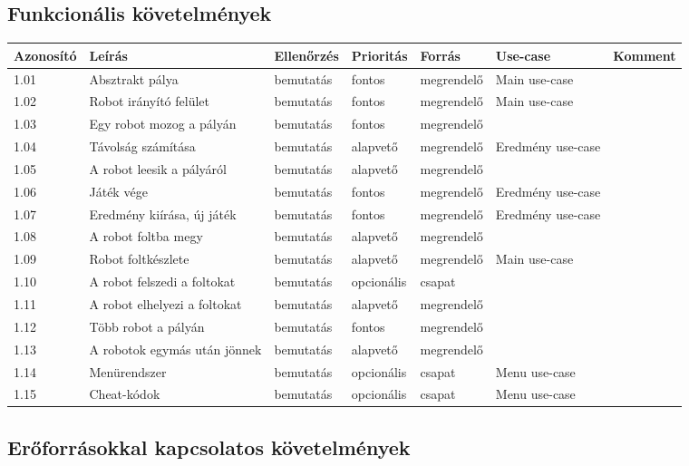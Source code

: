 \subsection{Funkcionális követelmények}


\begin{longtable}{| l | l | l | l | l | l | l |}
\hline
\textbf{Azonosító}   & \textbf{Leírás} & \textbf{Ellenőrzés} & \textbf{Prioritás} & \textbf{Forrás} & \textbf{Use-case} & \textbf{Komment} \tabularnewline
\hline\hline
1.01 & Absztrakt pálya & bemutatás & fontos & megrendelő & Main use-case & \tabularnewline
\hline
1.02 & Robot irányító felület & bemutatás & fontos & megrendelő & Main use-case & \tabularnewline
\hline
1.03 & Egy robot mozog a pályán & bemutatás & fontos & megrendelő &  & \tabularnewline
\hline
1.04 & Távolság számítása & bemutatás & alapvető & megrendelő & Eredmény use-case &  \tabularnewline
\hline
1.05 & A robot leesik a pályáról & bemutatás & alapvető & megrendelő &  &  \tabularnewline
\hline
1.06 & Játék vége & bemutatás & fontos & megrendelő & Eredmény use-case &  \tabularnewline
\hline
1.07 & Eredmény kiírása, új játék & bemutatás & fontos & megrendelő & Eredmény use-case &  \tabularnewline
\hline
1.08 & A robot foltba megy& bemutatás & alapvető & megrendelő &  & \tabularnewline
\hline
1.09 & Robot foltkészlete & bemutatás & alapvető & megrendelő & Main use-case &  \tabularnewline
\hline
1.10 & A robot felszedi a foltokat & bemutatás & opcionális & csapat &  &  \tabularnewline
\hline
1.11 & A robot elhelyezi a foltokat & bemutatás & alapvető & megrendelő &  &  \tabularnewline
\hline
1.12 & Több robot a pályán & bemutatás & fontos & megrendelő &  &  \tabularnewline
\hline
1.13 & A robotok egymás után jönnek & bemutatás & alapvető & megrendelő &  &  \tabularnewline
\hline
1.14 & Menürendszer & bemutatás & opcionális & csapat & Menu use-case &  \tabularnewline
\hline
1.15 & Cheat-kódok & bemutatás & opcionális & csapat & Menu use-case &  \tabularnewline
\hline
\end{longtable}

\subsection{Erőforrásokkal kapcsolatos követelmények}

